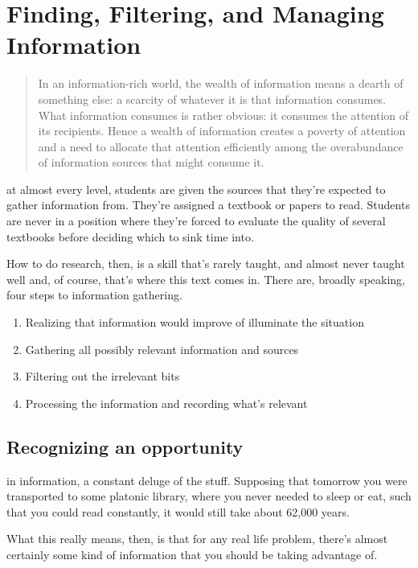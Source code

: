 \chapter{Finding, Filtering, and Managing Information}
\begin{quote}
  In an information-rich world, the wealth of information means a dearth of something else: a scarcity of whatever it is that information consumes. What information consumes is rather obvious: it consumes the attention of its recipients. Hence a wealth of information creates a poverty of attention and a need to allocate that attention efficiently among the overabundance of information sources that might consume it.
\end{quote}

 at almost every level, students are given the sources that they're expected to gather information from. They're assigned a textbook or papers to read. Students are never in a position where they're forced to evaluate the quality of several textbooks before deciding which to sink time into.

How to do research, then, is a skill that's rarely taught, and almost never taught well and, of course, that's where this text comes in. There are, broadly speaking, four steps to information gathering.

\begin{enumerate}
  \item Realizing that information would improve of illuminate the situation
  \item Gathering all possibly relevant information and sources
  \item Filtering out the irrelevant bits
  \item Processing the information and recording what's relevant
\end{enumerate}

\section{Recognizing an opportunity}

 in information, a constant deluge of the stuff. Supposing that tomorrow you were transported to some platonic library, where you never needed to sleep or eat, such that you could read constantly, it would still take about 62,000 years.

What this really means, then, is that for any real life problem, there's almost certainly some kind of information that you should be taking advantage of.

